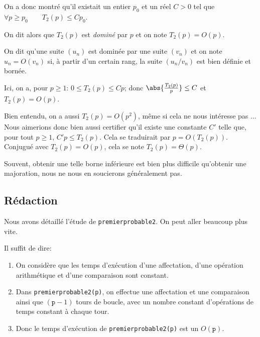 
On a donc montré qu'il existait un entier $p_{0}$ et un réel $C>0$ tel que
$  \forall p\geq p_0 \qquad T_{2}(p)\leq Cp_0$.

On dit alors que $T_{2}(p)$ est \emph{dominé} par $p$ et on note
$  T_{2}(p) = O(p)$.

\begin{defi}{}
  On dit qu'une suite $(u_{n})$ est dominée par une suite $(v_{n})$ et
  on note $u_{n} = O(v_{n})$ si,  à partir d'un certain rang, la suite
  $(u_{n}/v_{n})$ est bien définie et bornée.  
\end{defi}

Ici, on a, pour $p\geq 1$: $0 \leq T_{2}(p) \leq C p$; donc $ \abs{\frac{T_{2}(p)}{p}} \leq C$ et $T_{2}(p)=O(p)$.

\begin{remarque}
  Bien entendu, on a aussi $T_2(p) = O(p^2)$, même si cela ne nous intéresse pas ... Nous aimerions donc bien aussi certifier qu'il existe une constante $C'$ telle que, pour tout $p\geq 1$, $C'p \leq T_2(p)$. 
  Cela se traduirait par $p = O(T_2(p))$. Conjugué avec $T_2(p) = O(p)$, cela se note $T_2(p) =\Theta(p)$. 
  
  Souvent, obtenir une telle borne inférieure est bien plus difficile qu'obtenir une majoration, nous ne nous en soucierons généralement pas. 
\end{remarque}


\subsection{Rédaction}
Nous avons détaillé l'étude de \texttt{premierprobable2}. On peut aller
beaucoup plus vite.

Il suffit de dire:

\begin{enumerate}
\item On considère que les temps d'exécution d'une affectation, d'une
  opération arithmétique et d'une comparaison sont constant.
\item Dans \texttt{premierprobable2(p)}, on effectue une affectation et
  une comparaison ainsi que $(\texttt{p}-1)$ tours de boucle, avec un
  nombre constant d'opérations de temps constant à chaque tour.
\item Donc le temps d'exécution de \texttt{premierprobable2(p)} est un
  $O(\texttt{p})$.
\end{enumerate}


